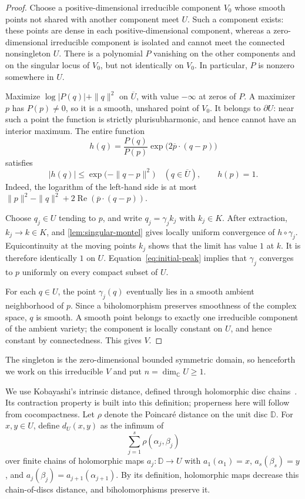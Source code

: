 \begin{proof}
Choose a positive-dimensional irreducible component $V_0$ whose smooth points not shared with another component meet $U$.  Such a component exists: these points are dense in each positive-dimensional component, whereas a zero-dimensional irreducible component is isolated and cannot meet the connected nonsingleton $U$.  There is a polynomial $P$ vanishing on the other components and on the singular locus of $V_0$, but not identically on $V_0$.  In particular, $P$ is nonzero somewhere in $U$.

Maximize $\log|P(q)|+\|q\|^2$ on $\overline U$, with value $-\infty$ at zeros of $P$.  A maximizer $p$ has $P(p)\ne0$, so it is a smooth, unshared point of $V_0$.  It belongs to $\partial U$: near such a point the function is strictly plurisubharmonic, and hence cannot have an interior maximum. The entire function
\[
  h(q)=\frac{P(q)}{P(p)}
          \exp\bigl(2\overline p\cdot(q-p)\bigr)
\]
satisfies
\begin{equation}\label{eq:initial-peak}
  |h(q)|\leq \exp\bigl(-\|q-p\|^2\bigr)
  \quad(q\in\overline U),\qquad h(p)=1.
\end{equation}
Indeed, the logarithm of the left-hand side is at most $\|p\|^2-\|q\|^2+2\operatorname{Re}(\overline p\cdot(q-p))$.

Choose $q_j\in U$ tending to $p$, and write $q_j=\gamma_j k_j$ with $k_j\in K$.  After extraction, $k_j\to k\in K$, and \cref{lem:singular-montel} gives locally uniform convergence of $h\circ\gamma_j$.  Equicontinuity at the moving points $k_j$ shows that the limit has value $1$ at $k$.  It is therefore identically $1$ on $U$. Equation~\eqref{eq:initial-peak} implies that $\gamma_j$ converges to $p$ uniformly on every compact subset of $U$.

For each $q\in U$, the point $\gamma_j(q)$ eventually lies in a smooth ambient neighborhood of $p$.  Since a biholomorphism preserves smoothness of the complex space, $q$ is smooth.  A smooth point belongs to exactly one irreducible component of the ambient variety; the component is locally constant on $U$, and hence constant by connectedness.  This gives $V$.
\end{proof}

The singleton is the zero-dimensional bounded symmetric domain, so henceforth we work on this irreducible $V$ and put $n=\dim_\mathbb{C}U\geq1$.

We use Kobayashi's intrinsic distance, defined through holomorphic disc chains~\cite[Section~2]{Kobayashi1967}. Its contraction property is built into this definition; properness here will follow from cocompactness. Let $\rho$ denote the Poincar\'e distance on the unit disc $\mathbb{D}$.  For $x,y\in U$, define $d_U(x,y)$ as the infimum of
\[
                    \sum_{j=1}^s\rho(\alpha_j,\beta_j)
\]
over finite chains of holomorphic maps $a_j:\mathbb{D}\to U$ with $a_1(\alpha_1)=x$, $a_s(\beta_s)=y$, and $a_j(\beta_j)=a_{j+1}(\alpha_{j+1})$.  By its definition, holomorphic maps decrease this chain-of-discs distance, and biholomorphisms preserve it.

